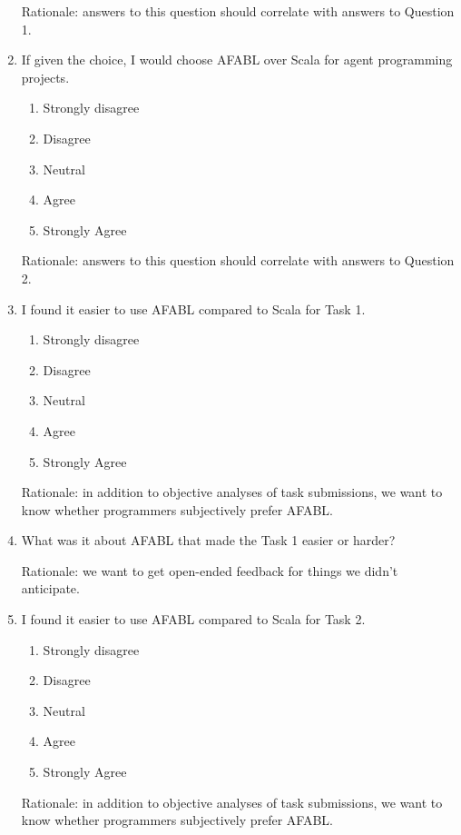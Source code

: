 \begin{appendices}
\begin{enumerate}
Rationale: answers to this question should correlate with answers to Question 1.

\item If given the choice, I would choose AFABL over Scala for agent programming projects.

\begin{enumerate}
\item Strongly disagree
\item Disagree
\item Neutral
\item Agree
\item Strongly Agree
\end{enumerate}

Rationale: answers to this question should correlate with answers to Question 2.

\item I found it easier to use AFABL compared to Scala for Task 1.

\begin{enumerate}
\item Strongly disagree
\item Disagree
\item Neutral
\item Agree
\item Strongly Agree
\end{enumerate}

Rationale: in addition to objective analyses of task submissions, we want to know whether programmers subjectively prefer AFABL.

\item What was it about AFABL that made the Task 1 easier or harder?

Rationale: we want to get open-ended feedback for things we didn’t anticipate.

\item I found it easier to use AFABL compared to Scala for Task 2.

\begin{enumerate}
\item Strongly disagree
\item Disagree
\item Neutral
\item Agree
\item Strongly Agree
\end{enumerate}

Rationale: in addition to objective analyses of task submissions, we want to know whether programmers subjectively prefer AFABL.


\end{enumerate}
\end{appendices}
